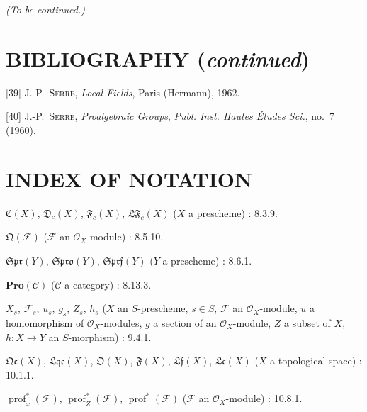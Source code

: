 
\begin{center}
\emph{(To be continued.)}
\end{center}

\clearpage
{}
{}
\section*{BIBLIOGRAPHY (\emph{continued})}

\begingroup
\small
\setlength{\parindent}{0pt}
\setlength{\parskip}{3pt}
[39] J.-P.~\textsc{Serre}, \emph{Local Fields}, Paris (Hermann), 1962.

[40] J.-P.~\textsc{Serre}, \emph{Proalgebraic Groups}, \emph{Publ. Inst. Hautes Études Sci.}, no.~7 (1960).

\endgroup

\clearpage
{}
{}
\section*{INDEX OF NOTATION}

\begingroup
\small
\setlength{\parindent}{0pt}
\setlength{\parskip}{2pt}

$\mathfrak C(X)$, $\mathfrak D_c(X)$, $\mathfrak F_c(X)$,
$\mathfrak{LF}_c(X)$ ($X$ a prescheme) : 8.3.9.

$\mathfrak Q(\mathcal F)$ ($\mathcal F$ an $\mathcal O_X$-module) : 8.5.10.

$\mathfrak{Spr}(Y)$, $\mathfrak{Spro}(Y)$, $\mathfrak{Sprf}(Y)$
($Y$ a prescheme) : 8.6.1.

$\mathbf{Pro}(\mathcal C)$ ($\mathcal C$ a category) : 8.13.3.

$X_s$, $\mathcal F_s$, $u_s$, $g_s$, $Z_s$, $h_s$
($X$ an $S$-prescheme, $s\in S$, $\mathcal F$ an $\mathcal O_X$-module,
$u$ a homomorphism of $\mathcal O_X$-modules, $g$ a section of an
$\mathcal O_X$-module, $Z$ a subset of $X$, $h:X\to Y$ an $S$-morphism) : 9.4.1.

$\mathfrak{Qc}(X)$, $\mathfrak{Lqc}(X)$, $\mathfrak O(X)$,
$\mathfrak F(X)$, $\mathfrak{Lf}(X)$, $\mathfrak{Lc}(X)$
($X$ a topological space) : 10.1.1.

$\operatorname{prof}^{*}_{x}(\mathcal F)$,
$\operatorname{prof}^{*}_{Z}(\mathcal F)$,
$\operatorname{prof}^{*}(\mathcal F)$
($\mathcal F$ an $\mathcal O_X$-module) : 10.8.1.

